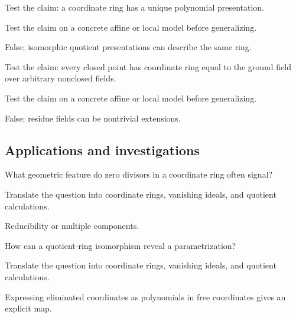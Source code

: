 \begin{exercise}\label{exr:vi03-expand-11}
Test the claim: a coordinate ring has a unique polynomial presentation.
\end{exercise}
\begin{hint}
Test the claim on a concrete affine or local model before generalizing.
\end{hint}
\begin{solution}
False; isomorphic quotient presentations can describe the same ring.
\end{solution}

\begin{exercise}\label{exr:vi03-expand-12}
Test the claim: every closed point has coordinate ring equal to the ground field over arbitrary nonclosed fields.
\end{exercise}
\begin{hint}
Test the claim on a concrete affine or local model before generalizing.
\end{hint}
\begin{solution}
False; residue fields can be nontrivial extensions.
\end{solution}

\subsection*{Applications and investigations}

\begin{exercise}\label{exr:vi03-expand-13}
What geometric feature do zero divisors in a coordinate ring often signal?
\end{exercise}
\begin{hint}
Translate the question into coordinate rings, vanishing ideals, and quotient calculations.
\end{hint}
\begin{solution}
Reducibility or multiple components.
\end{solution}

\begin{exercise}[Parametrization]\label{exr:vi03-expand-14}
How can a quotient-ring isomorphism reveal a parametrization?
\end{exercise}
\begin{hint}
Translate the question into coordinate rings, vanishing ideals, and quotient calculations.
\end{hint}
\begin{solution}
Expressing eliminated coordinates as polynomials in free coordinates gives an explicit map.
\end{solution}

